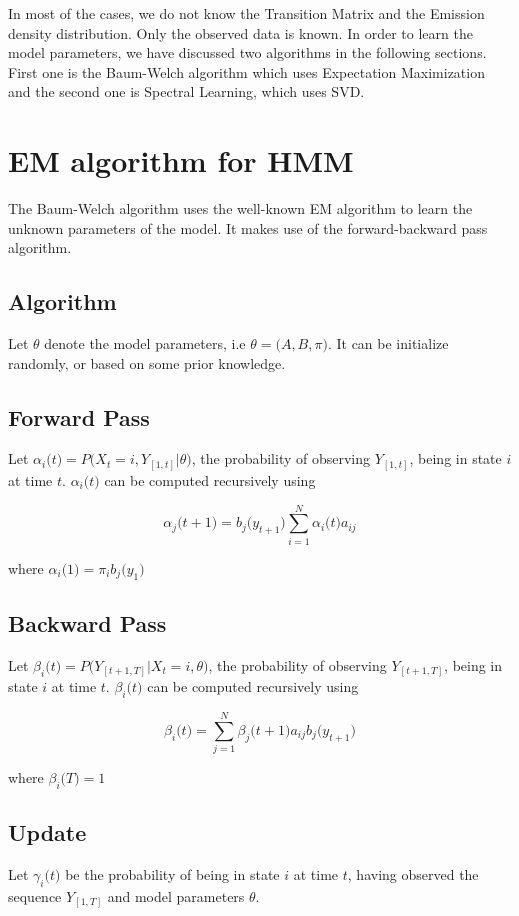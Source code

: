 \documentclass{article} %
\begin{document}
In most of the cases, we do not know the Transition Matrix and the Emission density distribution. Only
the observed data is known. In order to learn the model parameters, we have discussed two algorithms in the following sections. First one is the Baum-Welch algorithm which uses Expectation Maximization and the second one is Spectral Learning, which uses SVD.

\section{EM algorithm for HMM}
\label{EM algorithm}
The Baum-Welch algorithm uses the well-known EM algorithm to learn the unknown parameters of the model. It makes use of the forward-backward pass algorithm. 

\subsection*{Algorithm}
Let $\theta$ denote the model parameters, i.e \( \theta = \big(A,B,\pi\big) \). It can be initialize randomly, or based on some prior knowledge.

\subsection*{Forward Pass}
Let $\alpha_i\big(t\big) = P\big(X_t=i,Y_{[1,t]}|\theta\big)$, the probability of observing  $Y_{[1,t]}$, being in state $i$ at time $t$. $\alpha_i\big(t\big)$ can be computed recursively using

\[\alpha_j\big(t+1\big) = b_j\big(y_{t+1}\big)\sum_{i=1}^N\alpha_i\big(t\big)a_{ij}\]

where $\alpha_i\big(1\big) = \pi_ib_j\big(y_1\big)$

\subsection*{Backward Pass}
Let $\beta_i\big(t\big) = P\big(Y_{[t+1,T]}|X_t=i,\theta\big)$, the probability of observing  $Y_{[t+1,T]}$, being in state $i$ at time $t$. $\beta_i\big(t\big)$ can be computed recursively using

\[\beta_i\big(t\big) = \sum_{j=1}^N\beta_j\big(t+1\big)a_{ij}b_j\big(y_{t+1}\big) \]

where $\beta_i\big(T\big) = 1$

\subsection*{Update}
Let $\gamma_i\big(t\big)$ be the probability of being in state $i$ at time $t$, having observed the sequence $Y_{[1,T]}$ and model parameters $\theta$.
\end{document}
